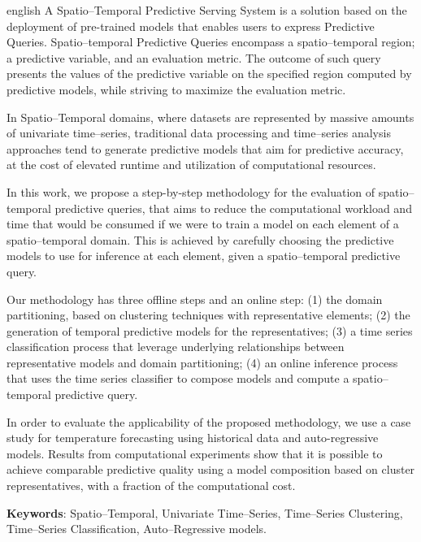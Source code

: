 \documentclass[
	final,				%
	12pt,				%
	openright,			%
	oneside,			%
	a4paper,			%
	hyphens,            %
	sumario=tradicional,%
	english,			%
	french,				%
	spanish,			%
	brazil				%
	]{abntex2}
\begin{document}
\begin{resumo}[Abstract]
 \begin{otherlanguage*}{english}
 A Spatio--Temporal Predictive Serving System is a solution based on the deployment of pre-trained models that enables users to express Predictive Queries. Spatio--temporal Predictive Queries encompass a spatio--temporal region; a predictive variable, and an evaluation metric. The outcome of such query presents the values of the predictive variable on the specified region computed by predictive models, while striving to maximize the evaluation metric.
 
 In Spatio--Temporal domains, where datasets are represented by massive amounts of univariate time--series, traditional data processing and time--series analysis approaches tend to generate predictive models that aim for predictive accuracy, at the cost of elevated runtime and utilization of computational resources.

 In this work, we propose a step-by-step methodology for the evaluation of spatio--temporal predictive queries, that aims to reduce the computational workload and time that would be consumed if we were to train a model on each element of a spatio–temporal domain.  This is achieved by carefully choosing the predictive models to use for inference at each element, given a spatio--temporal predictive query.
 
 Our methodology has three offline steps and an online step: (1) the domain partitioning, based on clustering techniques with representative elements; (2) the generation of temporal predictive models for the representatives; (3) a time series classification process that leverage underlying relationships between representative models and domain partitioning; (4) an online inference process that uses the time series classifier to compose models and compute a spatio--temporal predictive query.
 
 In order to evaluate the applicability of the proposed methodology, we use a case study for temperature forecasting using historical data and auto-regressive models. Results from computational experiments show that it is possible to achieve comparable predictive quality using a model composition based on cluster representatives, with a fraction of the computational cost. 
 
   \textbf{Keywords}: Spatio--Temporal, Univariate Time--Series, Time--Series Clustering, Time--Series Classification, Auto--Regressive models.
 \end{otherlanguage*}
\end{resumo}
\end{document}
